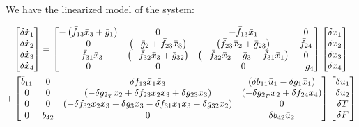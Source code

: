 We have the linearized model of the system:

\begin{multline}\label{eqn::lin_model}
    \begin{bmatrix} \delta \dot x_1 \\ \delta \dot x_2 \\ \delta \dot x_3 \\ \delta \dot x_4 \end{bmatrix} = \begin{bmatrix} -\left(  \bar f_{13} \bar x_3 + \bar g_1  \right) &
                    0 &
                    -\bar f_{13} \bar x_1 &
                    0 \\
                    0 &
                    \left(  -\bar g_2 + \bar f_{23} \bar x_3  \right)&
                    \left( \bar f_{23} \bar x_2 + \bar g_{23} \right)&
                    \bar f_{24} \\
                    -\bar f_{31} \bar x_3 &
                    \left( -\bar f_{32} \bar x_3 + \bar g_{32}  \right) &
                    \left( -\bar f_{32} \bar x_2 - \bar g_3 - \bar f_{31} \bar x_1  \right) &
                    0 \\
                    0 & 0 & 0 & -g_4
                     \end{bmatrix}
    \begin{bmatrix} \delta x_1 \\ \delta x_2 \\ \delta x_3 \\ \delta x_4 \end{bmatrix}\\
            +\begin{bmatrix}  \bar b_{11} &
                            0 &
                            \delta f_{13} \bar x_1 \bar x_3 &
                            \left( \delta b_{11} \bar u_1- \delta g_1 \bar x_1 \right)
                            \\
                        0&
                        0 &
                        \left( -\delta g_{2_T} \bar x_2 + \delta f_{23} \bar x_2 \bar x_3 + \delta g_{23} \bar x_3 \right) &
                        \left( -\delta g_{2_F} \bar x_2 + \delta f_{24} \bar x_4  \right)
                        \\
                        0&
                        0&
                        \left( -\delta f_{32} \bar x_2 \bar x_3 - \delta g_3 \bar x_3 - \delta f_{31} \bar x_1 \bar x_3 + \delta g_{32} \bar x_2  \right) &
                        0
                        \\
                        0&
                        \bar b_{42}&
                        0&
                        \delta b_{42} \bar u_2
                         \end{bmatrix}
    \begin{bmatrix} \delta u_1 \\ \delta u_2 \\ \delta T \\ \delta F \end{bmatrix}
\end{multline}

